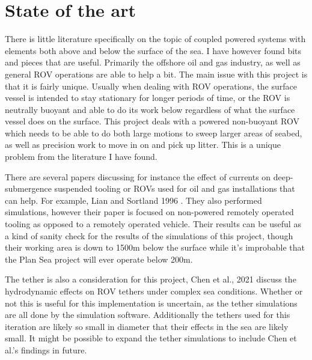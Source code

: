 \section{State of the art}
There is little literature specifically on the topic of coupled powered systems with elements both above and below the surface of the sea. I have however found bits and pieces that are useful. Primarily the offshore oil and gas industry, as well as general ROV operations are able to help a bit. The main issue with this project is that it is fairly unique. Usually when dealing with ROV operations, the surface vessel is intended to stay stationary for longer periods of time, or the ROV is neutrally buoyant and able to do its work below regardless of what the surface vessel does on the surface. This project deals with a powered non-buoyant ROV which needs to be able to do both large motions to sweep larger areas of seabed, as well as precision work to move in on and pick up litter. This is a unique problem from the literature I have found.

There are several papers discussing for instance the effect of currents on deep-submergence suspended tooling or ROVs used for oil and gas installations that can help. For example, Lian and Sortland 1996 \cite{lian_manoeuvering_1996}. They also performed simulations, however their paper is focused on non-powered remotely operated tooling as opposed to a remotely operated vehicle. Their results can be useful as a kind of sanity check for the results of the simulations of this project, though their working area is down to 1500m below the surface while it's improbable that the Plan Sea project will ever operate below 200m. 

The tether is also a consideration for this project, Chen et al., 2021 \cite{chen_dynamic_2021} discuss the hydrodynamic effects on ROV tethers under complex sea conditions. Whether or not this is useful for this implementation is uncertain, as the tether simulations are all done by the simulation software. Additionally the tethers used for this iteration are likely so small in diameter that their effects in the sea are likely small. It might be possible to expand the tether simulations to include Chen et al.'s findings in future.

